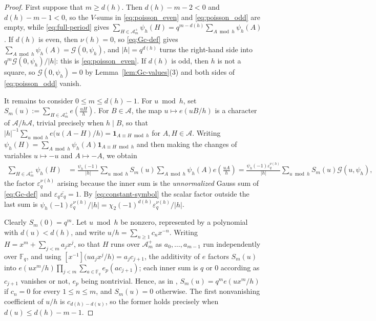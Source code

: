 \documentclass[a4paper,reqno]{amsart}
\numberwithin{equation}{section}
\theoremstyle{remark}
\theoremstyle{definition}
\newcommand{\A}{\mathcal{A}}
\newcommand{\Apn}[1]{\A^+_{#1}}
\newcommand{\epsq}{\varepsilon_q}
\newcommand{\Gc}{\mathcal{G}}
\begin{document}
\begin{proof}
First suppose that $m\ge d(h)$. Then $d(h)-m-2<0$ and $d(h)-m-1<0$, so the
$V$-sums in \eqref{eq:poisson_even} and \eqref{eq:poisson_odd} are empty,
while \eqref{eq:full-period} gives
$\sum_{H\in\Apn{m}}\psi_h(H)=q^{m-d(h)}\sum_{A\bmod h}\psi_h(A)$. If
$d(h)$ is even, then $\nu(h)=0$, so \eqref{eq:Gc-def} gives
$\sum_{A\bmod h}\psi_h(A)=\Gc(0,\psi_h)$, and $|h|=q^{d(h)}$ turns the
right-hand side into $q^m\Gc(0,\psi_h)/|h|$: this is
\eqref{eq:poisson_even}. If $d(h)$ is odd, then $h$ is not a square, so
$\Gc(0,\psi_h)=0$ by Lemma~\ref{lem:Gc-values}(3) and both sides of
\eqref{eq:poisson_odd} vanish.

It remains to consider $0\le m\le d(h)-1$. For $u\bmod h$, set
$S_m(u):= \sum_{H\in\Apn{m}}e\!\left(\frac{uH}{h}\right)$. For $B\in\A$, the
map $u\mapsto e(uB/h)$ is a character of $\A/h\A$, trivial precisely when
$h\mid B$, so that
$|h|^{-1}\sum_{u\bmod h}e\bigl(u(A-H)/h\bigr)=\mathbf 1_{A\equiv H\bmod h}$
for $A,H\in\A$. Writing
$\psi_h(H)=\sum_{A\bmod h}\psi_h(A)\mathbf 1_{A\equiv H\bmod h}$ and then
making the changes of variables $u\mapsto-u$ and $A\mapsto-A$, we obtain
\begin{align*}
\sum_{H\in\Apn{m}}\psi_h(H)
&=
\frac{\psi_h(-1)}{|h|}
\sum_{u\bmod h}S_m(u)
\sum_{A\bmod h}\psi_h(A)e\!\left(\frac{uA}{h}\right)
=
\frac{\psi_h(-1)\epsq^{\nu(h)}}{|h|}
\sum_{u\bmod h}S_m(u)\Gc(u,\psi_h),
\end{align*}
the factor $\epsq^{\nu(h)}$ arising because the inner sum is the
\emph{unnormalized} Gauss sum of \eqref{eq:Gc-def} and $\epsq\overline{\epsq}=1$.
By \eqref{eq:constant-symbol} the scalar factor outside the last sum is
$\psi_h(-1)\epsq^{\nu(h)}/|h|=\chi_2(-1)^{d(h)}\epsq^{\nu(h)}/|h|$.

Clearly $S_m(0)=q^m$. Let $u\bmod h$ be nonzero, represented by a polynomial
with $d(u)<d(h)$, and write $u/h=\sum_{n\ge1}c_nx^{-n}$. Writing
$H=x^m+\sum_{j<m}a_jx^j$, so that $H$ runs over $\Apn{m}$ as
$a_0,\dots,a_{m-1}$ run independently over $\mathbb F_q$, and using
$[x^{-1}]\bigl(ua_jx^j/h\bigr)=a_jc_{j+1}$, the additivity of $e$ factors
$S_m(u)$ into
$e(ux^m/h)\prod_{j<m}\sum_{a\in\mathbb F_q}e_p(ac_{j+1})$; each inner sum is
$q$ or $0$ according as $c_{j+1}$ vanishes or not, $e_p$ being nontrivial.
Hence, as in \cite[Proposition~3.1]{Fl17-1}, $S_m(u)=q^me(ux^m/h)$ if
$c_n=0$ for every $1\le n\le m$, and $S_m(u)=0$ otherwise. The first
nonvanishing coefficient of $u/h$ is $c_{d(h)-d(u)}$, so the former holds
precisely when $d(u)\le d(h)-m-1$.


\end{proof}
\end{document}
